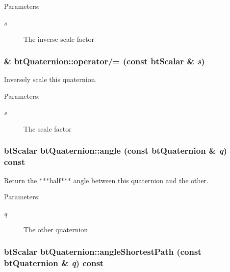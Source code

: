 \begin{Desc}
\item[Parameters:]
\begin{description}
\item[{\em s}]The inverse scale factor \end{description}
\end{Desc}
\hypertarget{classbt_quaternion_294fe99e7e5a8e0d45d111334e2e1552}{
\subsubsection[operator/=]{\& btQuaternion::operator/= (const btScalar \& {\em s})}}
\label{classbt_quaternion_294fe99e7e5a8e0d45d111334e2e1552}


Inversely scale this quaternion. 

\begin{Desc}
\item[Parameters:]
\begin{description}
\item[{\em s}]The scale factor \end{description}
\end{Desc}
\hypertarget{classbt_quaternion_6398a143dbe4bbf6211d90bc8c2dd2bc}{
\subsubsection[angle]{\setlength{\rightskip}{0pt plus 5cm}btScalar btQuaternion::angle (const {\bf btQuaternion} \& {\em q}) const}}
\label{classbt_quaternion_6398a143dbe4bbf6211d90bc8c2dd2bc}


Return the $\ast$$\ast$$\ast$half$\ast$$\ast$$\ast$ angle between this quaternion and the other. 

\begin{Desc}
\item[Parameters:]
\begin{description}
\item[{\em q}]The other quaternion \end{description}
\end{Desc}
\hypertarget{classbt_quaternion_3160453535401db05d3926d7bc0ca5de}{
\subsubsection[angleShortestPath]{\setlength{\rightskip}{0pt plus 5cm}btScalar btQuaternion::angleShortestPath (const {\bf btQuaternion} \& {\em q}) const}}
\label{classbt_quaternion_3160453535401db05d3926d7bc0ca5de}


